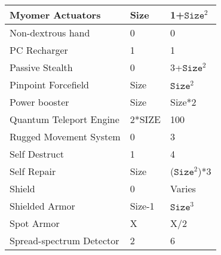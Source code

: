\documentclass[twoside]{book}
\begin{document}
\begin{longtable}{p{1.25in}ll}
  \raggedright
           Myomer Actuators 
  &
   Size 
  &
   1+\begin{math}{\texttt{Size}}^{2}\end{math} 
  \tabularnewline
  \hline
      
  \raggedright
           Non-dextrous hand 
  &
   0 
  &
   0 
  \tabularnewline
  \hline
      
  \raggedright
           PC Recharger 
  &
   1 
  &
   1 
  \tabularnewline
  \hline
      
  \raggedright
           Passive Stealth 
  &
   0 
  &
   3+\begin{math}{\texttt{Size}}^{2}\end{math} 
  \tabularnewline
  \hline
      
  \raggedright
           Pinpoint Forcefield 
  &
   Size 
  &
   \begin{math}{\texttt{Size}}^{2}\end{math} 
  \tabularnewline
  \hline
      
  \raggedright
           Power booster 
  &
   Size 
  &
   Size*2 
  \tabularnewline
  \hline
      
  \raggedright
           Quantum Teleport Engine
           
  &
   2*SIZE 
  &
   100 
  \tabularnewline
  \hline
      
  \raggedright
           Rugged Movement System 
  &
   0 
  &
   3 
  \tabularnewline
  \hline
      
  \raggedright
           Self Destruct 
  &
   1 
  &
   4 
  \tabularnewline
  \hline
      
  \raggedright
           Self Repair 
  &
   Size 
  &
   (\begin{math}{\texttt{Size}}^{2}\end{math})*3 
  \tabularnewline
  \hline
      
  \raggedright
           Shield 
  &
   0 
  &
   Varies 
  \tabularnewline
  \hline
      
  \raggedright
           Shielded Armor 
  &
   Size-1 
  &
   \begin{math}{\texttt{Size}}^{3}\end{math} 
  \tabularnewline
  \hline
      
  \raggedright
           Spot Armor 
  &
   X 
  &
   X/2 
  \tabularnewline
  \hline
      
  \raggedright
           Spread-spectrum Detector
           
  &
   2 
  &
   6 
  \tabularnewline
  \hline
      

\end{longtable}
\end{document}
